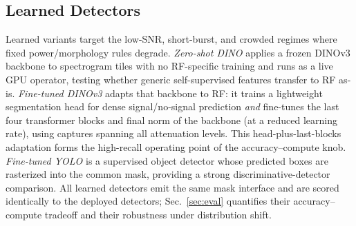 \subsection{Learned Detectors}
\label{sec:learned}

Learned variants target the low-SNR, short-burst, and crowded regimes where fixed
power/morphology rules degrade. \emph{Zero-shot DINO} applies a frozen DINOv3
backbone to spectrogram tiles with no RF-specific training and runs as a live GPU
operator, testing whether generic self-supervised features transfer to RF as-is.
\emph{Fine-tuned DINOv3} adapts that backbone to RF: it trains a lightweight
segmentation head for dense signal/no-signal prediction \emph{and} fine-tunes the last
four transformer blocks and final norm of the backbone (at a reduced learning rate),
using captures spanning all attenuation levels. This head-plus-last-blocks adaptation
forms the high-recall operating point of the accuracy--compute knob. \emph{Fine-tuned YOLO} is a supervised object detector whose predicted boxes
are rasterized into the common mask, providing a strong discriminative-detector
comparison. All learned detectors emit the same mask interface and are scored
identically to the deployed detectors; Sec.~\ref{sec:eval} quantifies their
accuracy--compute tradeoff and their robustness under distribution shift.
